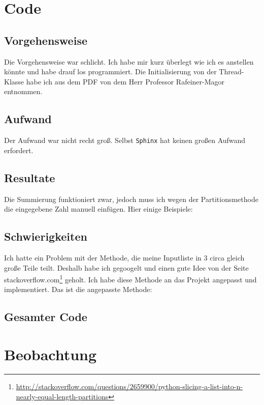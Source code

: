 
\section{Code}
\subsection{Vorgehensweise}
Die Vorgehensweise war schlicht. Ich habe mir kurz überlegt wie ich es anstellen könnte und habe drauf los programmiert. Die Initialisierung von der Thread-Klasse habe ich aus dem PDF von dem Herr Professor Rafeiner-Magor entnommen.
\subsection{Aufwand}
Der Aufwand war nicht recht groß. Selbst \verb|Sphinx| hat keinen großen Aufwand erfordert.
\subsection{Resultate}
Die Summierung funktioniert zwar, jedoch muss ich wegen der Partitionsmethode die eingegebene Zahl manuell einfügen. Hier einige Beispiele:



\subsection{Schwierigkeiten}
Ich hatte ein Problem mit der Methode, die meine Inputliste in 3 circa gleich große Teile teilt. Deshalb habe ich gegoogelt und einen gute Idee von der Seite stackoverflow.com\footnote{\url{http://stackoverflow.com/questions/2659900/python-slicing-a-list-into-n-nearly-equal-length-partitions}} geholt. Ich habe diese Methode an das Projekt angepasst und implementiert. Das ist die angepasste Methode:
\clearpage
\subsection{Gesamter Code}
\clearpage
\section{Beobachtung}
